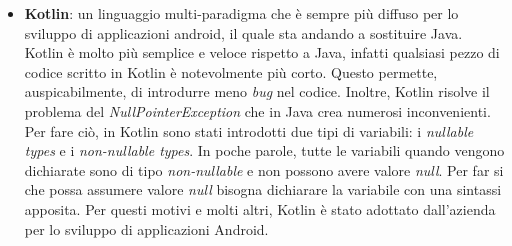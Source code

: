 \begin{itemize}
  \item \textbf{Kotlin}: un linguaggio multi-paradigma che è sempre più diffuso per lo sviluppo di applicazioni android, il quale sta andando a sostituire Java. Kotlin è molto più semplice e veloce rispetto a Java, infatti qualsiasi pezzo di codice scritto in Kotlin è notevolmente più corto. Questo permette, auspicabilmente, di introdurre meno \textit{bug} nel codice. Inoltre, Kotlin risolve il problema del \textit{NullPointerException} che in Java crea numerosi inconvenienti. Per fare ciò, in Kotlin sono stati introdotti due tipi di variabili: i \textit{nullable types} e i \textit{non-nullable types}. In poche parole, tutte le variabili quando vengono dichiarate sono di tipo \textit{non-nullable} e non possono avere valore \textit{null}. Per far si che possa assumere valore \textit{null} bisogna dichiarare la variabile con una sintassi apposita. Per questi motivi e molti altri, Kotlin è stato adottato dall'azienda per lo sviluppo di applicazioni Android.
\end{itemize}

